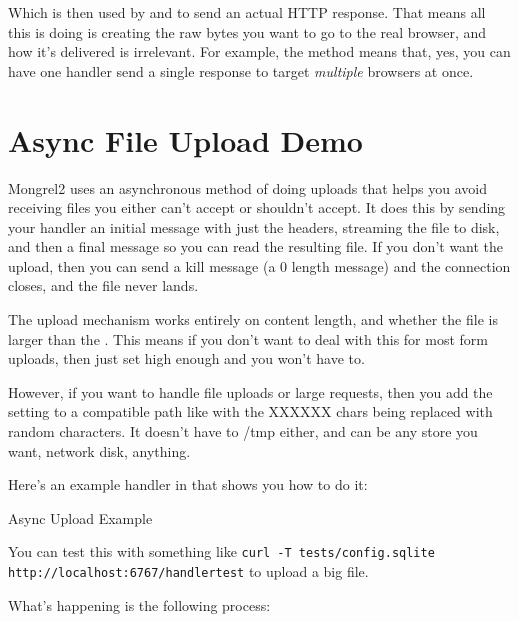 Which is then used by  and
 to send an actual HTTP response.  That
means all this is doing is creating the raw bytes you want to go
to the real browser, and how it's delivered is irrelevant.  For example,
the  method means that, yes, you can have one
handler send a single response to target \emph{multiple} browsers
at once.


\section{Async File Upload Demo}

Mongrel2 uses an asynchronous method of doing uploads that helps you 
avoid receiving files you either can't accept or shouldn't accept.  It does
this by sending your handler an initial message with just the headers, streaming
the file to disk, and then a final message so you can read the resulting file.
If you don't want the upload, then you can send a kill message (a 0 length message)
and the connection closes, and the file never lands.

The upload mechanism works entirely on content length, and whether the file
is larger than the .  This means if you don't
want to deal with this for most form uploads, then just set 
high enough and you won't have to.

However, if you want to handle file uploads or large requests, then you add
the setting  to a  compatible path
like  with the XXXXXX chars being replaced
with random characters.  It doesn't have to /tmp either, and can be any store
you want, network disk, anything.

Here's an example handler in  that shows
you how to do it:

\begin{code}{Async Upload Example}

\end{code}

You can test this with something like
\verb|curl -T tests/config.sqlite http://localhost:6767/handlertest| to upload a big file.

What's happening is the following process:

